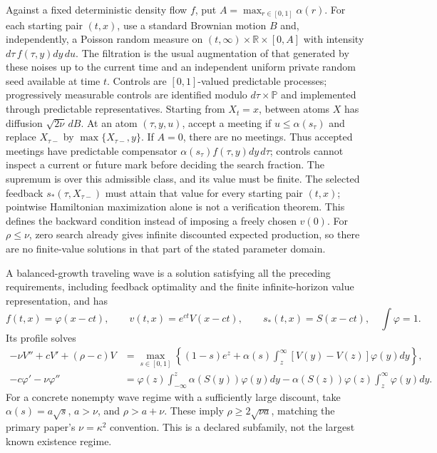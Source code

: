 \documentclass[11pt,a4paper]{article}
\begin{document}
Against a fixed deterministic density flow $f$, put $A=\max_{r\in[0,1]}\alpha(r)$. For each starting pair $(t,x)$, use a standard Brownian motion $B$ and, independently, a Poisson random measure on $(t,\infty)\times\mathbb R\times[0,A]$ with intensity $d\tau\,f(\tau,y)dy\,du$. The filtration is the usual augmentation of that generated by these noises up to the current time and an independent uniform private random seed available at time $t$. Controls are $[0,1]$-valued predictable processes; progressively measurable controls are identified modulo $d\tau\times\mathbb P$ and implemented through predictable representatives. Starting from $X_t=x$, between atoms $X$ has diffusion $\sqrt{2\nu}\,dB$. At an atom $(\tau,y,u)$, accept a meeting if $u\leq\alpha(s_\tau)$ and replace $X_{\tau-}$ by $\max\{X_{\tau-},y\}$. If $A=0$, there are no meetings. Thus accepted meetings have predictable compensator $\alpha(s_\tau)f(\tau,y)dy\,d\tau$; controls cannot inspect a current or future mark before deciding the search fraction. The supremum is over this admissible class, and its value must be finite. The selected feedback $s_*(\tau,X_{\tau-})$ must attain that value for every starting pair $(t,x)$; pointwise Hamiltonian maximization alone is not a verification theorem. This defines the backward condition instead of imposing a freely chosen $v(0)$. For $\rho\leq\nu$, zero search already gives infinite discounted expected production, so there are no finite-value solutions in that part of the stated parameter domain.

A balanced-growth traveling wave is a solution satisfying all the preceding requirements, including feedback optimality and the finite infinite-horizon value representation, and has
\[
 f(t,x)=\varphi(x-ct),\qquad v(t,x)=e^{ct}V(x-ct),\qquad
 s_*(t,x)=S(x-ct),\quad \int\varphi=1.
\]
Its profile solves
\[
 \begin{split}
 -\nu V''+cV'+(\rho-c)V
 &=\max_{s\in[0,1]}\left\{(1-s)e^z+
 \alpha(s)\int_z^\infty[V(y)-V(z)]\varphi(y)dy\right\},\\
 -c\varphi'-\nu\varphi''
 &=\varphi(z)\int_{-\infty}^z\alpha(S(y))\varphi(y)dy
  -\alpha(S(z))\varphi(z)\int_z^\infty\varphi(y)dy.
 \end{split}
\]
For a concrete nonempty wave regime with a sufficiently large discount, take $\alpha(s)=a\sqrt{s}$, $a>\nu$, and $\rho>a+\nu$. These imply $\rho\geq2\sqrt{\nu a}$, matching the primary paper's $\nu=\kappa^2$ convention. This is a declared subfamily, not the largest known existence regime.
\end{document}
